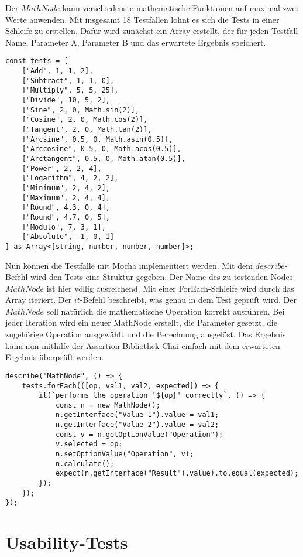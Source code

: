 Der $MathNode$ kann verschiedenste mathematische Funktionen auf maximal zwei Werte anwenden. Mit insgesamt 18 Testfällen lohnt es sich die Tests in einer Schleife zu erstellen. Dafür wird zunächst ein Array erstellt, der für jeden Testfall Name, Parameter A, Parameter B und das erwartete Ergebnis speichert.

\begin{lstlisting}[caption=Unit-Test: Testdefinition,label=unit2]
const tests = [
    ["Add", 1, 1, 2],
    ["Subtract", 1, 1, 0],
    ["Multiply", 5, 5, 25],
    ["Divide", 10, 5, 2],
    ["Sine", 2, 0, Math.sin(2)],
    ["Cosine", 2, 0, Math.cos(2)],
    ["Tangent", 2, 0, Math.tan(2)],
    ["Arcsine", 0.5, 0, Math.asin(0.5)],
    ["Arccosine", 0.5, 0, Math.acos(0.5)],
    ["Arctangent", 0.5, 0, Math.atan(0.5)],
    ["Power", 2, 2, 4],
    ["Logarithm", 4, 2, 2],
    ["Minimum", 2, 4, 2],
    ["Maximum", 2, 4, 4],
    ["Round", 4.3, 0, 4],
    ["Round", 4.7, 0, 5],
    ["Modulo", 7, 3, 1],
    ["Absolute", -1, 0, 1]
] as Array<[string, number, number, number]>;
\end{lstlisting}

Nun können die Testfälle mit Mocha implementiert werden. Mit dem  $describe$-Befehl wird den Tests eine Struktur gegeben. Der Name des zu testenden Nodes $MathNode$ ist hier völlig ausreichend. Mit einer ForEach-Schleife wird durch das Array iteriert. Der $it$-Befehl beschreibt, was genau in dem Test geprüft wird. Der $MathNode$ soll natürlich die mathematische Operation korrekt ausführen. Bei jeder Iteration wird ein neuer MathNode erstellt, die Parameter gesetzt, die zugehörige Operation ausgewählt und die Berechnung ausgelöst. Das Ergebnis kann nun mithilfe der Assertion-Bibliothek Chai einfach mit dem erwarteten Ergebnis überprüft werden. 

\begin{lstlisting}[caption=Unit-Test: Testdurchführung,label=unit3]
describe("MathNode", () => {
    tests.forEach(([op, val1, val2, expected]) => {
        it(`performs the operation '${op}' correctly`, () => {
            const n = new MathNode();
            n.getInterface("Value 1").value = val1;
            n.getInterface("Value 2").value = val2;
            const v = n.getOptionValue("Operation");
            v.selected = op;
            n.setOptionValue("Operation", v);
            n.calculate();
            expect(n.getInterface("Result").value).to.equal(expected);
        });
    });
});
\end{lstlisting}

\section{Usability-Tests}


